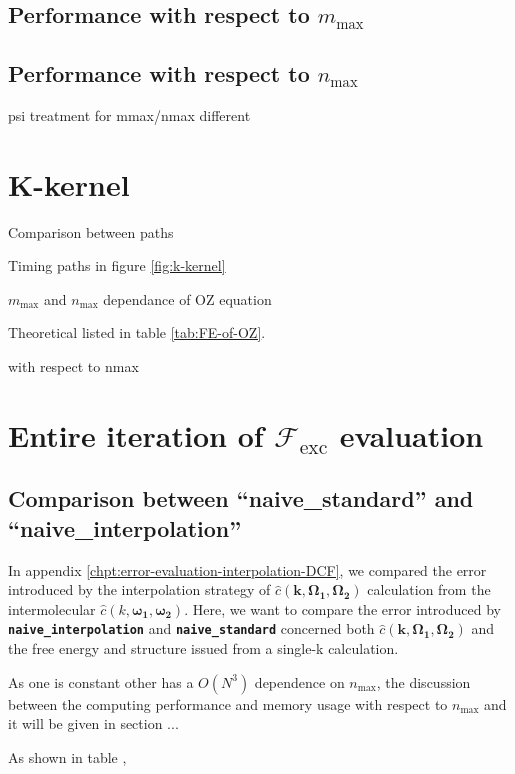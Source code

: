 \subsection{Performance with respect to $m_{\max}$}

\subsection{Performance with respect to $n_{\max}$}

psi treatment for mmax/nmax different

\section{K-kernel}

Comparison between paths

Timing paths in figure \ref{fig:k-kernel}

$m_{\max}$ and $n_{\max}$ dependance of OZ equation

Theoretical listed in table \ref{tab:FE-of-OZ}. 

with respect to nmax

\section{Entire iteration of $\mathcal{F}_{\mathrm{exc}}$ evaluation}

\subsection{Comparison between ``naive\_standard'' and ``naive\_interpolation''}

In appendix \ref{chpt:error-evaluation-interpolation-DCF}, we compared
the error introduced by the interpolation strategy of $\hat{c}(\mathbf{k},\mathbf{\Omega_{1}},\mathbf{\Omega_{2}})$
calculation from the intermolecular $\hat{c}(k,\boldsymbol{\omega_{1}},\boldsymbol{\omega_{2}})$.
Here, we want to compare the error introduced by \texttt{\textbf{naive\_interpolation}}
and\textbf{ }\texttt{\textbf{naive\_standard}} concerned both $\hat{c}(\mathbf{k},\mathbf{\Omega_{1}},\mathbf{\Omega_{2}})$
and the free energy and structure issued from a single-k calculation.

As one is constant other has a $O(N^{3})$ dependence on $n_{\max}$,
the discussion between the computing performance and memory usage
with respect to $n_{\max}$ and it will be given in section ...

As shown in table , 

